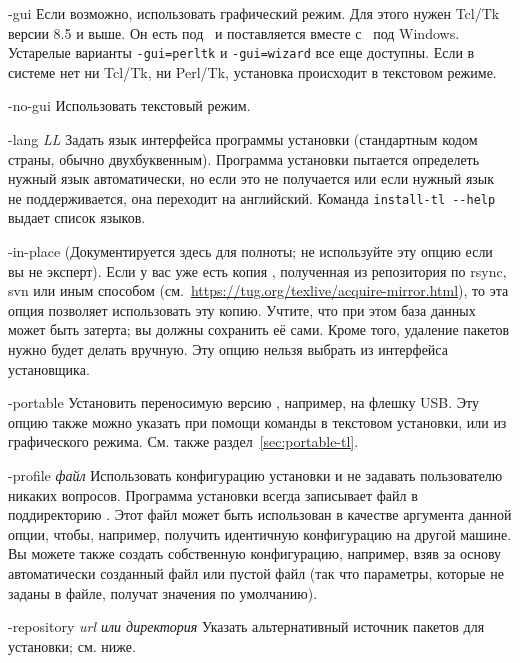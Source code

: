 \documentclass{article}
\begin{document}
\begin{ttdescription}
\item[-gui] Если возможно, использовать графический режим.  Для этого
  нужен Tcl/Tk версии 8.5 и выше.  Он есть под \MacOSX\ и поставляется
  вместе с \TL\ под Windows.  Устарелые варианты \texttt{-gui=perltk}
  и \texttt{-gui=wizard} все еще доступны.  Если в системе
  нет ни Tcl/Tk, ни Perl/Tk, установка происходит в текстовом режиме.

\item[-no-gui] Использовать текстовый режим.

\item[-lang {\sl LL}] Задать язык интерфейса программы установки
  (стандартным кодом страны, обычно двухбуквенным). 
Программа установки пытается определеть нужный язык
  автоматически, но если это не получается или если нужный язык не
  поддерживается, она переходит на английский.  Команда
  \verb|install-tl --help| выдает список языков.

\item[-in-place] (Документируется здесь для полноты; не используйте
  эту опцию если вы не эксперт).  Если у вас уже есть копия \TL,
  полученная из репозитория по rsync, svn или иным способом
  (см.~\url{https://tug.org/texlive/acquire-mirror.html}), то эта опция
  позволяет использовать эту копию.  Учтите, что при этом база данных
   может быть затерта; вы должны
  сохранить её сами.  Кроме того, удаление пакетов нужно будет делать
  вручную.  Эту опцию нельзя выбрать из интерфейса установщика.


\item[-portable] Установить переносимую версию \TL, например, на
  флешку USB.  Эту опцию также можно указать при помощи команды
   в текстовом установки, или из графического режима.  См.
  также раздел~\ref{sec:portable-tl}.

\item[-profile {\sl файл}] Использовать конфигурацию установки
   и не задавать пользователю никаких вопросов.  Программа
  установки всегда записывает файл  в
  поддиректорию .  Этот файл может быть использован в
  качестве аргумента данной опции, чтобы, например, получить
  идентичную конфигурацию на другой машине.  Вы можете также создать
  собственную конфигурацию, например, взяв за основу автоматически
  созданный файл или пустой файл (так что параметры, которые не заданы
  в файле, получат значения по умолчанию).

\item [-repository {\sl url или директория}] Указать альтернативный источник
пакетов для установки;  см. ниже.
\end{ttdescription}
\end{document}

